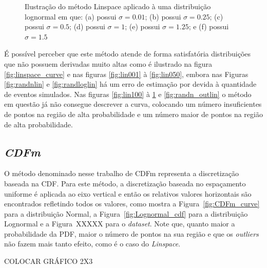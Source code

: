 \begin{figure}[H]
\begin{subfigure}[b]{0.3\textwidth}
		\caption{}
		\label{fig:lin150}
	\end{subfigure}
\caption{Ilustração do método Linspace aplicado à uma distribuição lognormal em que: (a) possui $\sigma = 0.01$; (b) possui $\sigma = 0.25$; (c) possui $\sigma = 0.5$; (d) possui $\sigma = 1$; (e) possui $\sigma = 1.25$; e (f) possui $\sigma = 1.5$}
\label{fig:Lognormal_lin}
\end{figure}


É possível perceber que este método atende de forma satisfatória distribuições que não possuem derivadas muito altas como é ilustrado na figura \ref{fig:linspace_curve} e nas figuras \ref{fig:lin001} à \ref{fig:lin050}, embora nas Figuras \ref{fig:randnlin} e \ref{fig:randloglin} há um erro de estimação por devida à quantidade de eventos simulados. Nas figuras \ref{fig:lin100} à \ref{fig:lin150} e \ref{fig:randn_outlin} o método em questão já não consegue descrever a curva, colocando um número insuficientes de pontos na região de alta probabilidade e um número maior de pontos na região de alta probabilidade.

\subsection{\textit{CDFm}}
O método denominado nesse trabalho de \ac{CDFm} representa a discretização baseada na \ac{CDF}. Para este método, a discretização baseada no espaçamento uniforme é aplicada ao eixo vertical e então os relativos valores horizontais são encontrados refletindo todos os valores, como mostra a Figura~\ref{fig:CDFm_curve} para a distribuição Normal, a Figura~\ref{fig:Lognormal_cdf} para a distribuição Lognormal e a Figura~XXXXX para o \textit{dataset}. Note que, quanto maior a probabilidade da \ac{PDF}, maior o número de pontos na sua região e que os \textit{outliers} não fazem mais tanto efeito, como é o caso do \textit{Linspace}.

\color{red} COLOCAR GRÁFICO 2X3 \color{black}

